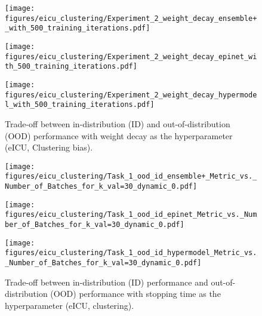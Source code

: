 \begin{figure}[h]
\centering
\begin{minipage}[b]{0.32\textwidth}
\centering
\texttt{[image: figures/eicu\_clustering/Experiment\_2\_weight\_decay\_ensemble+\_with\_500\_training\_iterations.pdf]}

\centering {\small{\ensembleplus}}
\end{minipage}
\hfill
\begin{minipage}[b]{0.32\textwidth}
\centering \texttt{[image: figures/eicu\_clustering/Experiment\_2\_weight\_decay\_epinet\_with\_500\_training\_iterations.pdf]}
\end{minipage}
\hfill
\begin{minipage}[b]{0.32\textwidth}
\centering \texttt{[image: figures/eicu\_clustering/Experiment\_2\_weight\_decay\_hypermodel\_with\_500\_training\_iterations.pdf]}
\end{minipage}
\caption{Trade-off between  in-distribution (ID) and out-of-distribution (OOD) performance with weight decay as the hyperparameter (eICU, Clustering bias). }
\label{fig:difficult_to_choose_weight_decay}
\end{figure}




    






\begin{figure}[h]
\centering
\begin{minipage}[b]{0.31\textwidth}
\centering
\texttt{[image: figures/eicu\_clustering/Task\_1\_ood\_id\_ensemble+\_Metric\_vs.\_Number\_of\_Batches\_for\_k\_val=30\_dynamic\_0.pdf]}
\centering {\small{\ensembleplus}}
\label{fig:ensemble+_difficult_to_choose_stopping_time}
\end{minipage}
\hfill
\begin{minipage}[b]{0.31\textwidth}
\centering \texttt{[image: figures/eicu\_clustering/Task\_1\_ood\_id\_epinet\_Metric\_vs.\_Number\_of\_Batches\_for\_k\_val=30\_dynamic\_0.pdf]}
\label{fig:epinet_difficult_to_choose_stopping_time}
\end{minipage}
\hfill
\begin{minipage}[b]{0.31\textwidth}
\centering \texttt{[image: figures/eicu\_clustering/Task\_1\_ood\_id\_hypermodel\_Metric\_vs.\_Number\_of\_Batches\_for\_k\_val=30\_dynamic\_0.pdf]}
\label{fig:hypermodel_difficult_to_choose_stopping_time}
\end{minipage}
\caption{Trade-off between  in-distribution (ID) performance and out-of-distribution (OOD) performance with stopping time as the hyperparameter (eICU, clustering).}
\label{fig:difficult_to_choose_stopping_time}
\end{figure}
    


